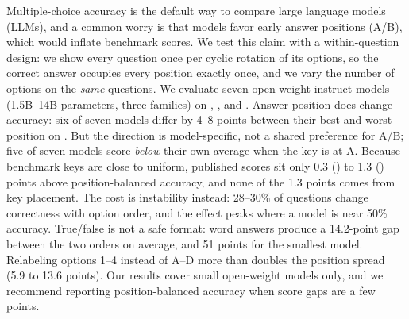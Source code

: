 Multiple-choice accuracy is the default way to compare large language models (LLMs), and a common worry is that models favor early answer positions (A/B), which would inflate benchmark scores.
We test this claim with a within-question design: we show every question once per cyclic rotation of its options, so the correct answer occupies every position exactly once, and we vary the number of options on the \emph{same} questions.
We evaluate seven open-weight instruct models (1.5B--14B parameters, three families) on \mmlu, \csqa, and \boolq.
Answer position does change accuracy: six of seven models differ by 4--8 points between their best and worst position on \mmlu.
But the direction is model-specific, not a shared preference for A/B; five of seven models score \emph{below} their own average when the key is at A.
Because benchmark keys are close to uniform, published scores sit only 0.3 (\csqa) to 1.3 (\mmlu) points above position-balanced accuracy, and none of the 1.3 points comes from key placement.
The cost is instability instead: 28--30\% of questions change correctness with option order, and the effect peaks where a model is near 50\% accuracy.
True/false is not a safe format: word answers produce a 14.2-point gap between the two orders on average, and 51 points for the smallest model.
Relabeling options 1--4 instead of A--D more than doubles the position spread (5.9 to 13.6 points).
Our results cover small open-weight models only, and we recommend reporting position-balanced accuracy when score gaps are a few points.

